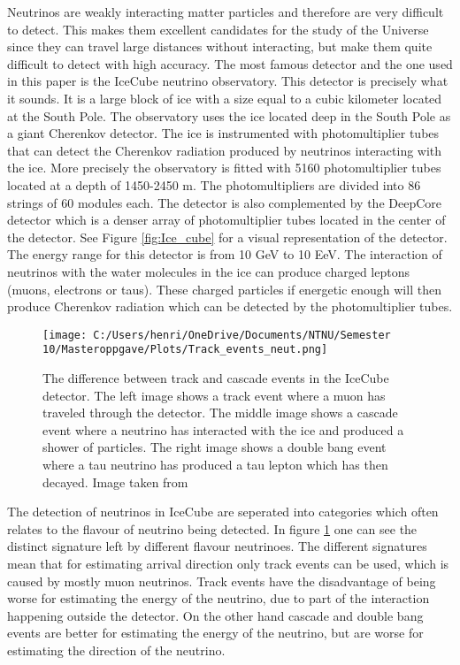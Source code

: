 Neutrinos are weakly interacting matter particles and therefore are very difficult to detect. This makes them excellent candidates for the study of the Universe since they can travel large distances without interacting, but make them 
quite difficult to detect with high accuracy. The most famous detector and the one used in this paper is the IceCube neutrino observatory. This detector is precisely what it sounds. It is a large block of ice with a size equal to a cubic kilometer located at the South Pole.
The observatory uses the ice located deep in the South Pole as a giant Cherenkov detector. The ice is instrumented with photomultiplier tubes that can detect the Cherenkov radiation produced by neutrinos interacting with the ice. 
More precisely the observatory is fitted with 5160 photomultiplier tubes located at a depth of 1450-2450 m. The photomultipliers are divided into 86 strings of 60 modules each. The detector is also complemented by the DeepCore detector which is a denser array of photomultiplier tubes located in the center of the detector. See Figure \ref{fig:Ice_cube} for a visual representation of the detector.
The energy range for this detector is from 10 GeV to 10 EeV. The interaction of neutrinos with the water molecules in the ice can produce charged leptons (muons, electrons or taus). These charged particles if energetic enough will then produce Cherenkov radiation which can be detected by the photomultiplier tubes.

\begin{figure}
    \centering
    \texttt{[image: C:/Users/henri/OneDrive/Documents/NTNU/Semester 10/Masteroppgave/Plots/Track\_events\_neut.png]}
    \caption{The difference between track and cascade events in the IceCube detector. The left image shows a track event where a muon has traveled through the detector. The middle image shows a cascade event where a neutrino has interacted with the ice and produced a shower of particles. The right image shows a double bang event where a tau neutrino has produced a tau lepton which has then decayed. Image taken from \cite{LectureA}}
    \label{fig:track_neut}
\end{figure}

The detection of neutrinos in IceCube are seperated into categories which often relates to the flavour of neutrino being detected. In figure \ref{fig:track_neut} one can see the distinct signature left by different flavour neutrinoes. The different signatures mean that for estimating arrival direction only track events can be used, which is caused by mostly muon neutrinos. Track events have the disadvantage of being worse for estimating the energy of the neutrino, due to part of the interaction happening outside the detector. On the other hand cascade and double bang events are better for estimating the energy of the neutrino, but are worse for estimating the direction of the neutrino.


